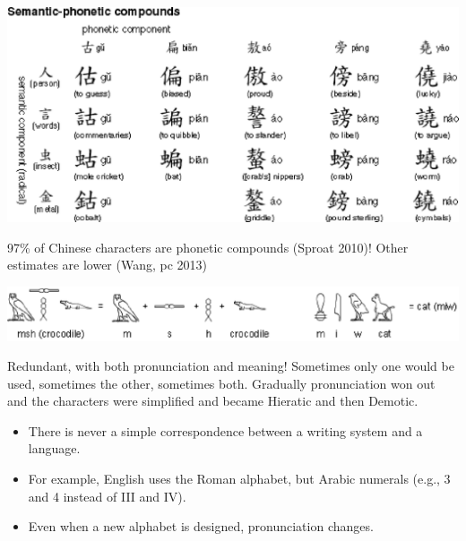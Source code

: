 \documentclass[a4paper,landscape,headrule,footrule,xetex]{foils}
\begin{document}

 \includegraphics{../pics/hanzi-4.eps}

97\% of Chinese characters are phonetic compounds (Sproat 2010)!  Other estimates are lower (Wang, pc 2013)





 \includegraphics{../pics/hiero.eps}

Redundant, with both pronunciation and meaning!  Sometimes only one
would be used, sometimes the other, sometimes both.  Gradually
pronunciation won out and the characters were simplified and became
Hieratic and then Demotic.





\begin{itemize}
\item There is never a simple correspondence between a writing system
  and a language.
\item For example, English uses the Roman alphabet, but Arabic numerals (e.g., 3 and 4 instead of III and IV).
\item Even when a new alphabet is designed, pronunciation changes.

\end{itemize}








\end{document}
